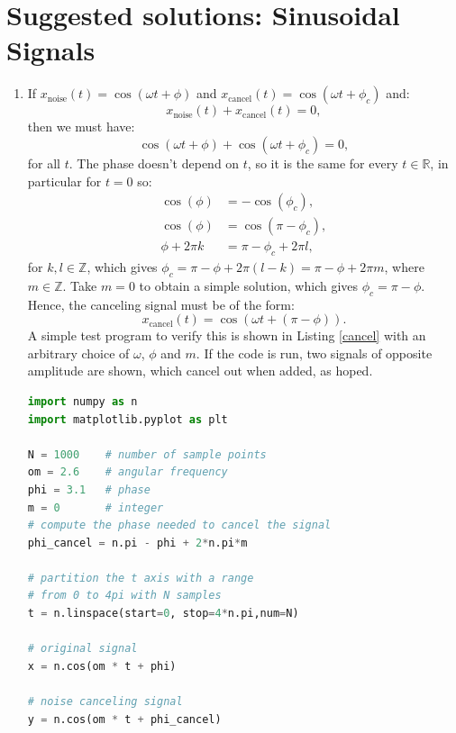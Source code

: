 \newpage
\section{Suggested solutions: Sinusoidal Signals}
\begin{enumerate}
\item If $x_{\text{noise}}(t)=\cos(\omega t+\phi)$ and $x_{\text{cancel}}(t)=\cos(\omega t+\phi_{c})$ and:
$$x_{\text{noise}}(t)+x_{\text{cancel}}(t)=0,$$
then we must have:
$$\cos(\omega t+\phi)+\cos(\omega t+\phi_{c})=0,$$
for all $t$. The phase doesn't depend on $t$, so it is the same for every $t\in\mathbb{R}$, in particular for $t=0$ so:
\begin{align*}
    \cos(\phi)&=-\cos(\phi_{c}), \\
    \cos(\phi)&=\cos(\pi -\phi_{c}), \\
    \phi+2\pi k&=\pi-\phi_{c}+2\pi l,
\end{align*}
for $k,l\in\mathbb{Z}$, which gives $\phi_{c}=\pi-\phi+2\pi(l-k)=\pi-\phi+2\pi m$, 
where $m\in\mathbb{Z}$. Take $m=0$ to obtain a simple solution, which gives $\phi_{c}=\pi -\phi$.
Hence, the canceling signal must be of the form:
$$x_{\text{cancel}}(t)=\cos(\omega t+(\pi-\phi)).$$
A simple test program to verify this is shown in Listing \ref{cancel} 
with an arbitrary choice of $\omega$, $\phi$ and $m$. 
If the code is run, two signals of opposite amplitude are shown, 
which cancel out when added, as hoped. 

\begin{lstlisting}[language=Python, caption=Noise canceling signal,label=cancel]
import numpy as n
import matplotlib.pyplot as plt

N = 1000    # number of sample points
om = 2.6    # angular frequency
phi = 3.1   # phase
m = 0       # integer
# compute the phase needed to cancel the signal
phi_cancel = n.pi - phi + 2*n.pi*m    

# partition the t axis with a range 
# from 0 to 4pi with N samples
t = n.linspace(start=0, stop=4*n.pi,num=N)

# original signal
x = n.cos(om * t + phi)

# noise canceling signal
y = n.cos(om * t + phi_cancel)


\end{lstlisting}
\end{enumerate}
